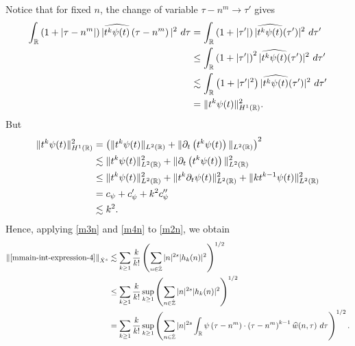 %
%
Notice that for fixed $n$, the change of variable $\tau - n^m \to \tau'$
gives
%
%
\begin{equation}
	\label{m3n}
	\begin{split}
		\int_{\mathbb{R}} \left( 1 + | \tau - n^m | \right) | \widehat{t^{k}
		\psi(t)}\left( \tau - n^m \right) |^2 \ d \tau
		& = \int_{\mathbb{R}} \left( 1 + |\tau'| \right) | \widehat{t^k \psi(t)}(\tau') |^2 \
		d \tau'
		\\
		& \le \int_{\mathbb{R}} \left( 1 + |\tau'| \right)^2 | \widehat{t^k \psi(t)}(\tau')
		|^2 \ d \tau'
		\\
		& \lesssim \int_{\mathbb{R}} \left( 1 + | \tau' |^2 \right) | \widehat{t^{k}
		\psi(t)}(\tau') |^2 \ d \tau'
		\\
		& = \|t^k \psi(t) \|_{H^1(\mathbb{R})}^2.
	\end{split}
\end{equation}
%
%
But
%
%
\begin{equation}
	\label{m4n}
	\begin{split}
		\|t^k \psi(t) \|_{H^1(\mathbb{R})}^2
		& = \left( \|t^k \psi(t)\|_{L^2(\mathbb{R})} + \|\partial_t \left( t^k \psi(t)
		\right)\|_{L^2(\mathbb{R})} \right)^2
		\\
		& \lesssim \|t^{k}\psi(t) \|_{L^2(\mathbb{R})}^2 + \|\partial_t \left (t^{k}
		\psi(t) \right )\|_{L^2(\mathbb{R})}^2
		\\
		& \le \|t^k \psi(t) \|_{L^2(\mathbb{R})}^2 + \|t^k \partial_t \psi(t)
		\|_{L^2(\mathbb{R})}^2 + \|k t^{k -1} \psi(t) \|_{L^2(\mathbb{R})}^2
		\\
		& = c_{\psi} + c_{\psi}' + k^2 c_{\psi}''
		\\
		& \lesssim k^2.
	\end{split}
\end{equation}
%
%
Hence, applying \eqref{m3n} and \eqref{m4n} to \eqref{m2n}, we obtain
%
\begin{equation}
	\label{m5n}
	\begin{split}
		\|\eqref{mmain-int-expression-4} \|_{\dot{X}^s}
		& \lesssim
		\sum_{k \ge 1} \frac{k}{k!} \left( \sum_{n \in \dot{\mathbb{Z}}} |n|^{2s} | h_k(n) |^2 
		\right)^{1/2}
		\\
		& \le \sum_{k \ge 1} \frac{k}{k!}
		 \sup_{k \ge 1} \left( \sum_{n \in \dot{\mathbb{Z}}} |n|^{2s} | 
		h_k(n) |^2 \right)^{1/2}
		\\
		& = \sum_{k \ge 1} \frac{k}{k!}  \sup_{k \ge 1} 
		\left( \sum_{n \in \dot{\mathbb{Z}}} |n|^{2s} \int_{\mathbb{R}} 
		\psi\left( \tau - n^m \right) \cdot \left( \tau - n^m 
		\right)^{k -1} \widehat{w}(n, \tau) \ d \tau \right)^{1/2}.
	\end{split}
\end{equation}
%
